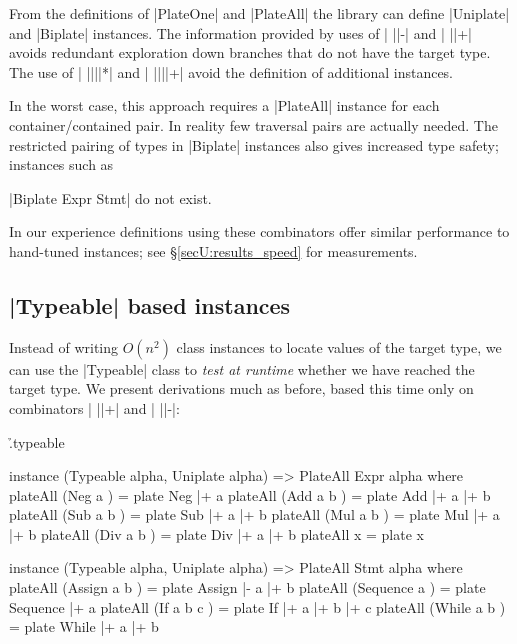 From the definitions of |PlateOne| and |PlateAll| the library can define |Uniplate| and |Biplate| instances. The information provided by uses of | ||-| and | ||+| avoids redundant exploration down branches that do not have the target type. The use of | ||||*| and | ||||+| avoid the definition of additional instances.

In the worst case, this approach requires a |PlateAll| instance for each container/contained pair. In reality few traversal pairs are actually needed. The restricted pairing of types in |Biplate| instances also gives increased type safety; instances such as \ignore|Biplate Expr Stmt| do not exist.

In our experience definitions using these combinators offer similar performance to hand-tuned instances; see \S\ref{secU:results_speed} for measurements.


\subsection{|Typeable| based instances}
\label{secU:implement_playtypeable}

Instead of writing $O(n^2)$ class instances to locate values of the target type, we can use the |Typeable| class to \textit{test at runtime} whether we have reached the target type. We present derivations much as before, based this time only on combinators | ||+| and | ||-|:

\begin{comment}
\h{.typeable}\begin{code}
type Type from to = (Str to, Str to -> from)
uniplateAll :: PlateAll a b => a -> (Str b, Str b -> a)
class PlateAll from to where
    plateAll :: from -> Type from to
plate :: from -> Type from to
(|+) :: (Typeable item, Typeable to, PlateAll item to) => Type (item -> from) to -> item -> Type from to
(|-) :: Type (item -> from) to -> item -> Type from to
instance (PlateAll from to, Typeable from, Typeable to, Uniplate to) => PlateAll [from] to where
\end{code}
\end{comment}

\h{.typeable}\begin{code}
instance (Typeable alpha, Uniplate alpha) => PlateAll Expr alpha where
    plateAll (Neg a    )  = plate Neg  |+ a
    plateAll (Add a b  )  = plate Add  |+ a |+ b
    plateAll (Sub a b  )  = plate Sub  |+ a |+ b
    plateAll (Mul a b  )  = plate Mul  |+ a |+ b
    plateAll (Div a b  )  = plate Div  |+ a |+ b
    plateAll x            = plate x

instance (Typeable alpha, Uniplate alpha) => PlateAll Stmt alpha where
    plateAll (Assign    a b    ) = plate Assign    |-  a |+ b
    plateAll (Sequence  a      ) = plate Sequence  |+  a
    plateAll (If        a b c  ) = plate If        |+  a |+ b |+ c
    plateAll (While     a b    ) = plate While     |+  a |+ b
\end{code}

